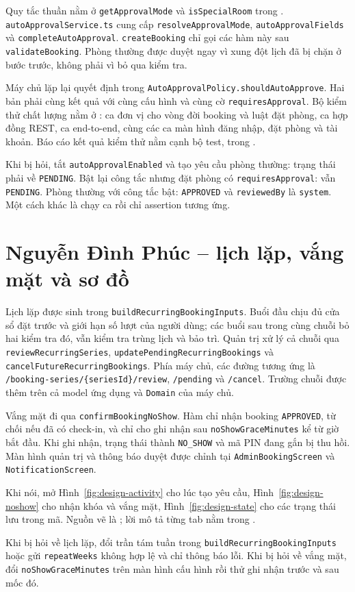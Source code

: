 \documentclass[../DoAn.tex]{subfiles}
\begin{document}
Quy tắc thuần nằm ở \texttt{getApprovalMode} và \texttt{isSpecialRoom} trong . \texttt{autoApprovalService.ts} cung cấp \texttt{resolveApprovalMode}, \texttt{autoApprovalFields} và \texttt{completeAutoApproval}. \texttt{createBooking} chỉ gọi các hàm này sau \texttt{validateBooking}. Phòng thường được duyệt ngay vì xung đột lịch đã bị chặn ở bước trước, không phải vì bỏ qua kiểm tra.

Máy chủ lặp lại quyết định trong \texttt{AutoApprovalPolicy.\allowbreak shouldAutoApprove}. Hai bản phải cùng kết quả với cùng cấu hình và cùng cờ \texttt{requiresApproval}. Bộ kiểm thử chất lượng nằm ở : ca đơn vị cho vòng đời booking và luật đặt phòng, ca hợp đồng REST, ca end-to-end, cùng các ca màn hình đăng nhập, đặt phòng và tài khoản. Báo cáo kết quả kiểm thử nằm cạnh bộ test, trong .

Khi bị hỏi, tắt \texttt{autoApprovalEnabled} và tạo yêu cầu phòng thường: trạng thái phải về \texttt{PENDING}. Bật lại công tắc nhưng đặt phòng có \texttt{requiresApproval}: vẫn \texttt{PENDING}. Phòng thường với công tắc bật: \texttt{APPROVED} và \texttt{reviewedBy} là \texttt{system}. Một cách khác là chạy ca  rồi chỉ assertion tương ứng.

\section{Nguyễn Đình Phúc -- lịch lặp, vắng mặt và sơ đồ}
\label{section:assignment-phuc}

Lịch lặp được sinh trong \texttt{buildRecurringBookingInputs}. Buổi đầu chịu đủ cửa sổ đặt trước và giới hạn số lượt của người dùng; các buổi sau trong cùng chuỗi bỏ hai kiểm tra đó, vẫn kiểm tra trùng lịch và bảo trì. Quản trị xử lý cả chuỗi qua \texttt{reviewRecurringSeries}, \texttt{updatePendingRecurringBookings} và \texttt{cancelFutureRecurringBookings}. Phía máy chủ, các đường tương ứng là \texttt{/booking-series/\{seriesId\}/review}, \texttt{/pending} và \texttt{/cancel}. Trường chuỗi được thêm trên cả model ứng dụng và \texttt{Domain} của máy chủ.

Vắng mặt đi qua \texttt{confirmBookingNoShow}. Hàm chỉ nhận booking \texttt{APPROVED}, từ chối nếu đã có check-in, và chỉ cho ghi nhận sau \texttt{noShowGraceMinutes} kể từ giờ bắt đầu. Khi ghi nhận, trạng thái thành \texttt{NO\_SHOW} và mã PIN đang gắn bị thu hồi. Màn hình quản trị và thông báo duyệt được chỉnh tại \texttt{AdminBookingScreen} và \texttt{NotificationScreen}.

Khi nói, mở Hình~\ref{fig:design-activity} cho lúc tạo yêu cầu, Hình~\ref{fig:design-noshow} cho nhận khóa và vắng mặt, Hình~\ref{fig:design-state} cho các trạng thái lưu trong mã. Nguồn vẽ là ; lời mô tả từng tab nằm trong .

Khi bị hỏi về lịch lặp, đổi trần tám tuần trong \texttt{buildRecurringBookingInputs} hoặc gửi \texttt{repeatWeeks} không hợp lệ và chỉ thông báo lỗi. Khi bị hỏi về vắng mặt, đổi \texttt{noShowGraceMinutes} trên màn hình cấu hình rồi thử ghi nhận trước và sau mốc đó.
\end{document}
